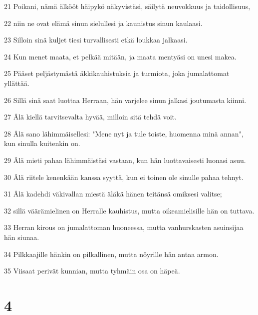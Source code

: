 \par 21 Poikani, nämä älkööt häipykö näkyvistäsi, säilytä neuvokkuus ja taidollisuus,
\par 22 niin ne ovat elämä sinun sielullesi ja kaunistus sinun kaulaasi.
\par 23 Silloin sinä kuljet tiesi turvallisesti etkä loukkaa jalkaasi.
\par 24 Kun menet maata, et pelkää mitään, ja maata mentyäsi on unesi makea.
\par 25 Pääset peljästymästä äkkikauhistuksia ja turmiota, joka jumalattomat yllättää.
\par 26 Sillä sinä saat luottaa Herraan, hän varjelee sinun jalkasi joutumasta kiinni.
\par 27 Älä kiellä tarvitsevalta hyvää, milloin sitä tehdä voit.
\par 28 Älä sano lähimmäisellesi: "Mene nyt ja tule toiste, huomenna minä annan", kun sinulla kuitenkin on.
\par 29 Älä mieti pahaa lähimmäistäsi vastaan, kun hän luottavaisesti luonasi asuu.
\par 30 Älä riitele kenenkään kanssa syyttä, kun ei toinen ole sinulle pahaa tehnyt.
\par 31 Älä kadehdi väkivallan miestä äläkä hänen teitänsä omiksesi valitse;
\par 32 sillä väärämielinen on Herralle kauhistus, mutta oikeamielisille hän on tuttava.
\par 33 Herran kirous on jumalattoman huoneessa, mutta vanhurskasten asuinsijaa hän siunaa.
\par 34 Pilkkaajille hänkin on pilkallinen, mutta nöyrille hän antaa armon.
\par 35 Viisaat perivät kunnian, mutta tyhmäin osa on häpeä.

\chapter{4}

